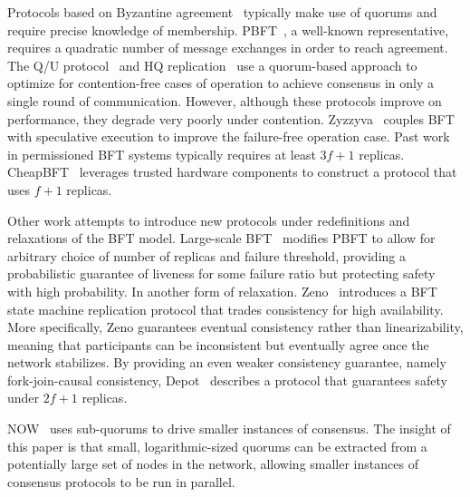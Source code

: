 {%
Protocols based on Byzantine agreement~\cite{PeaseSL80, LamportSP82} typically make use of
quorums and require precise knowledge of membership.
PBFT~\cite{castro1999practical, CL02}, a well-known representative, requires a quadratic number of message exchanges in order to
reach agreement. 
The Q/U protocol~\cite{abd2005fault} and HQ replication~\cite{cowling2006hq} use a quorum-based approach to optimize for contention-free cases of operation to achieve consensus in only a single round of communication. However, although these protocols improve on performance, they degrade very poorly under contention. Zyzzyva~\cite{KotlaADCW09} couples BFT with speculative execution to improve the failure-free operation case.
Past work in permissioned BFT systems typically requires at least $3f+1$ replicas. CheapBFT~\cite{kapitza2012cheapbft} leverages trusted hardware components to construct a protocol that uses $f+1$ replicas.

Other work attempts to introduce new protocols under redefinitions and relaxations of the BFT model. 
Large-scale BFT~\cite{rodrigues2007large} modifies PBFT to allow for arbitrary choice of number of replicas and failure threshold, providing a probabilistic guarantee of liveness for some failure ratio but protecting safety with high probability. 
In another form of relaxation. Zeno~\cite{singh2009zeno} introduces a BFT state machine replication protocol that trades consistency for high availability. More specifically, Zeno guarantees eventual consistency rather than linearizability, meaning that participants can be inconsistent but eventually agree once the network stabilizes. By providing an even weaker consistency guarantee, namely fork-join-causal consistency, Depot~\cite{mahajan2011depot} describes a protocol that guarantees safety under $2f+1$ replicas. 

NOW~\cite{guerraoui2013highly} uses sub-quorums to drive smaller instances of consensus. The insight of this paper is that small, logarithmic-sized quorums can be extracted from a potentially large set of nodes in the network, allowing smaller instances of consensus protocols to be run in parallel. 

}
